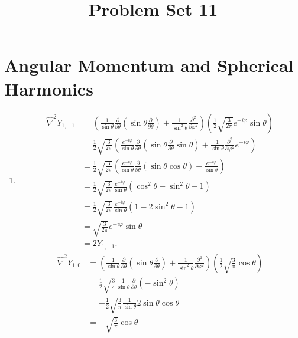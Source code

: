 \documentclass[11pt, letterpaper]{article}
\title{Problem Set 11}
\begin{document}
\makeproblem
\section{Angular Momentum and Spherical Harmonics}
\begin{enumerate}
	\item 
		\begin{align*}
			\hat{\nabla }^2 Y_{1,-1} &=\left( \frac{1}{\sin \theta } \frac{\partial }{\partial \theta } \left( \sin \theta \frac{\partial }{\partial \theta }  \right) +\frac{1}{\sin ^2\theta } \frac{\partial ^2}{\partial \varphi ^2}  \right) \left( \frac{1}{2} \sqrt{\frac{3}{2\pi } } e^{-i\varphi } \sin \theta  \right) \\
						 &=\frac{1}{2} \sqrt{\frac{3}{2\pi } } \left( \frac{e^{-i \varphi }}{\sin \theta } \frac{\partial }{\partial \theta } \left( \sin \theta \frac{\partial }{\partial \theta } \sin \theta  \right) +\frac{1}{\sin \theta } \frac{\partial^2 }{\partial \varphi ^2} e^{-i\varphi }  \right) \\
						 &=\frac{1}{2} \sqrt{\frac{3}{2\pi } } \left( \frac{e^{-i \varphi } }{\sin \theta } \frac{\partial }{\partial \theta } (\sin \theta \cos \theta )-\frac{e^{-i\varphi } }{\sin \theta }  \right) \\
						 &=\frac{1}{2} \sqrt{\frac{3}{2\pi } } \frac{e^{-i\varphi } }{\sin \theta } \left( \cos ^2\theta -\sin ^2\theta - 1\right) \\
						 &=\frac{1}{2} \sqrt{\frac{3}{2\pi } } \frac{e^{-i\varphi } }{\sin \theta } \left( 1-2 \sin ^2\theta- 1\right) \\
						 &=\sqrt{\frac{3}{2\pi } } e^{-i\varphi } \sin \theta \\
						 &=2Y_{1,-1} 
		.\end{align*}
		\begin{align*}
			\hat{\nabla }^2 Y_{1,0} &=\left( \frac{1}{\sin \theta }\frac{\partial }{\partial \theta } \left( \sin \theta \frac{\partial }{\partial \theta }  \right)  +\frac{1}{\sin ^2\theta } \frac{\partial ^2}{\partial \varphi ^2}  \right) \left(\frac{1}{2} \sqrt{\frac{3}{\pi } } \cos \theta \right)\\
						&=\frac{1}{2} \sqrt{\frac{3}{\pi } } \frac{1}{\sin \theta } \frac{\partial }{\partial \theta } \left( -\sin ^2 \theta \right) \\
						&=-\frac{1}{2} \sqrt{\frac{3}{\pi } } \frac{1}{\sin \theta } 2 \sin \theta \cos \theta \\
						&=-\sqrt{\frac{3}{\pi } } \cos \theta \\

\end{align*}
\end{enumerate}
\end{document}
